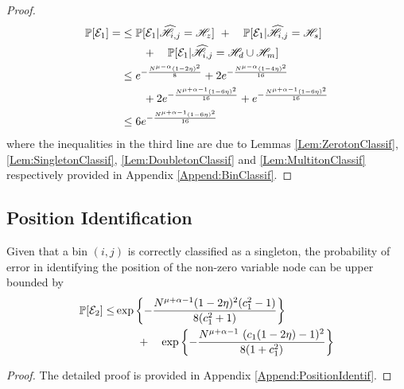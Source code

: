 \begin{proof}
\begin{align*}
\mathbb{P}[\mathcal{E}_1] =& \leq \mathbb{P}[\mathcal{E}_1|\widehat{\mathscr{H}}_{i,j}=\mathscr{H}_z]~+
						\quad \mathbb{P}[\mathcal{E}_1|\widehat{\mathscr{H}}_{i,j}=\mathscr{H}_s]~ \\
						&\qquad + \quad \mathbb{P}[\mathcal{E}_1|\widehat{\mathscr{H}}_{i,j}=\mathscr{H}_d \cup \mathscr{H}_m]\\
    			&\leq  e^{-\frac{N^{\mu-\alpha}(1-2\eta)^2}{8}}+2e^{-\frac{N^{\mu-\alpha}(1-4\eta)^2}{16}}\\ & \qquad + 2e^{-\frac{N^{\mu+\alpha-1}(1-6\eta)^2}{16}}+e^{-\frac{N^{\mu+\alpha-1}(1-6\eta)^2}{16}}\\
    			&\leq 6e^{-\frac{N^{\mu+\alpha-1}(1-6\eta)^2}{16}}\\
 \end{align*}
						where the inequalities in the third line are due to Lemmas \ref{Lem:ZerotonClassif}, \ref{Lem:SingletonClassif}, \ref{Lem:DoubletonClassif} and \ref{Lem:MultitonClassif} respectively provided in Appendix \ref{Append:BinClassif}.
\end{proof}

\subsection{\bf Position Identification}
\begin{lemma}
Given that a bin $(i,j)$ is correctly classified as a singleton, the probability of error in identifying the position of the non-zero variable node can be upper bounded by
\begin{align*}
\mathbb{P}[\mathcal{E}_2]\leq & \exp\left\lbrace-\frac{N^{\mu+\alpha-1}(1-2\eta)^2(c_1^2-1)}{8(c_1^2+1)}\right\rbrace\\
 &\qquad + \quad \exp\left\lbrace-\frac{N^{\mu+\alpha-1} ~ (c_1(1 - 2\eta) - 1)^2}{8(1+ c_1^2)}\right\rbrace
\end{align*}\label{Lem:posidentification}
\end{lemma}
\begin{proof}
	The detailed proof is provided in Appendix \ref{Append:PositionIdentif}.
\end{proof}

